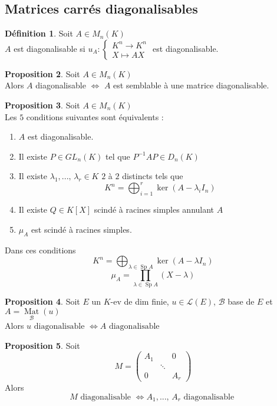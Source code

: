 \documentclass[10pt,a4paper]{article}
\theoremstyle{definition}
\newtheorem{proposition}{Proposition}[section]
\newtheorem{definition}[proposition]{Définition}
\DeclareMathOperator{\Sp}{Sp}
\DeclareMathOperator*{\Mat}{Mat}
\begin{document}
\subsection{Matrices carrés diagonalisables}
\begin{definition}
Soit $A \in M_n(K)$ \\
$A$ est diagonalisable si $u_A : \begin{cases}
K^n \to K^n \\
X \mapsto AX
\end{cases}$ est diagonalisable.
\end{definition}
\begin{proposition}
Soit $A \in M_n(K)$ \\
Alors $A$ diagonalisable $\iff$ $A$ est semblable à une matrice diagonalisable.
\end{proposition}
\begin{proposition}
Soit $A \in M_n(K)$ \\
Les $5$ conditions suivantes sont équivalents :
\begin{enumerate}
\item $A$ est diagonalisable.
\item Il existe $P \in GL_n(K)$ tel que $P^{-1}AP \in D_n(K)$
\item Il existe $\lambda_1, ...,\, \lambda_r \in K$ $2$ à $2$ distincts tels que
\[ K^n = \bigoplus_{i = 1}^r \ker \left( A - \lambda_i I_n \right) \]
\item Il existe $Q \in K[X]$ scindé à racines simples annulant $A$
\item $\mu_A$ est scindé à racines simples.
\end{enumerate}
Dans ces conditions
\[ \boxed{K^n = \bigoplus_{\lambda \in \Sp A} \ker \left( A - \lambda I_n \right)} \]
\[ \boxed{\mu_A = \prod_{\lambda \in \Sp A} (X - \lambda)} \]
\end{proposition}
\begin{proposition}
Soit $E$ un $K$-ev de dim finie, $u \in \mathcal{L}(E)$, $\mathcal{B}$ base de $E$ et $A = \Mat\limits_{\mathcal{B}}(u)$ \\
Alors $\boxed{u \text{ diagonalisable } \iff A \text{ diagonalisable }}$
\end{proposition}
\begin{proposition}
Soit 
\[ M = \begin{pmatrix}
\boxed{A_1} & & 0 \\
& \ddots &  \\
0 & & \boxed{A_r}
\end{pmatrix} \]
Alors \[ \boxed{M \text{ diagonalisable } \iff A_1, ...,\, A_r \text{ diagonalisable }} \]
\end{proposition}
\end{document}

